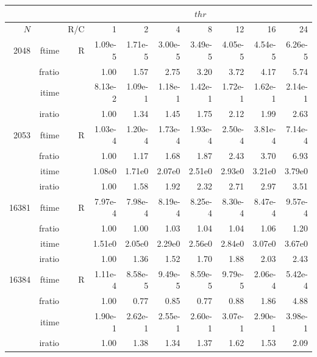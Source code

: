 \documentclass[a4paper]{article}
\begin{document}
\begin{table}[!htbp]
\begin{center}
\begin{small}
\begin{tabular}{|r|r|r|r|r|r|r|r|r|r|}
\hline 
     \multicolumn{3}{|c|}{ } & \multicolumn{7}{c|}{$thr$} \\ \hline
    $N$  & & R/C  & 1           & 2    & 4    & 8    & 12   & 16    & 24  \\ \hline\hline
    2048  & ftime & R  &  1.09e-5 &   1.71e-5 &   3.00e-5 &   3.49e-5 &   4.05e-5 &   4.54e-5 &   6.26e-5   \\ 
      & fratio & & 1.00 &    1.57 &    2.75 &    3.20 &    3.72 &    4.17 &    5.74   \\ 
     & itime & &  8.13e-2 &    1.09e-1 &   1.18e-1 &   1.42e-1 &   1.72e-1 &   1.62e-1 &   2.14e-1    \\ 
     & iratio & &   1.00 &    1.34 &    1.45 &    1.75 &    2.12 &    1.99 &    2.63    \\ \hline 
    2053  & ftime & R &  1.03e-4 &   1.20e-4 &   1.73e-4 &   1.93e-4 &   2.50e-4 &   3.81e-4 &   7.14e-4    \\ 
      & fratio & & 1.00 &   1.17 &   1.68 &   1.87 &   2.43 &   3.70 &   6.93    \\ 
     & itime &  &   1.08e0 &   1.71e0 &   2.07e0 &   2.51e0 &   2.93e0 &   3.21e0 &   3.79e0   \\ 
    & iratio &  &     1.00 &   1.58 &   1.92 &   2.32 &   2.71 &   2.97 &   3.51     \\ \hline 
  16381  & ftime & R &  7.97e-4 &   7.98e-4 &   8.19e-4 &   8.25e-4 &   8.30e-4 &   8.47e-4 &   9.57e-4     \\ 
      & fratio & &  1.00 &   1.00 &   1.03 &   1.04 &   1.04 &   1.06 &   1.20    \\ 
     & itime & &  1.51e0 &   2.05e0 &   2.29e0 &   2.56e0 &   2.84e0 &   3.07e0 &   3.67e0     \\ 
     & iratio & &  1.00 &   1.36 &   1.52 &   1.70 &   1.88 &   2.03 &   2.43     \\ \hline 
 16384  & ftime & R & 1.11e-4 &   8.58e-5 &   9.49e-5 &   8.59e-5 &   9.79e-5 &   2.06e-4 &   5.42e-4   \\ 
      & fratio & & 1.00 &   0.77 &   0.85 &   0.77 &   0.88 &   1.86 &   4.88  \\
     & itime & & 1.90e-1 &   2.62e-1 &   2.55e-1 &   2.60e-1 &   3.07e-1 &   2.90e-1 &   3.98e-1   \\ 
 & iratio & & 1.00 &   1.38 &   1.34 &   1.37 &   1.62 &   1.53 &   2.09   \\  \hline \hline

\end{tabular}
\end{small}
\end{center}
\end{table}
\end{document}
